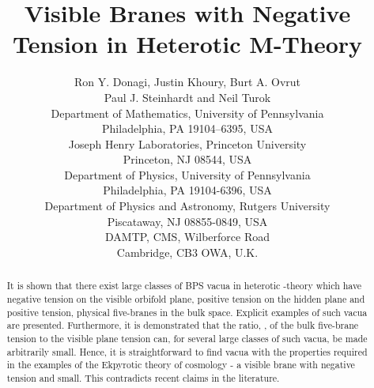 \documentclass[a4paper,12pt]{article}
\numberwithin{equation}{section}
\providecommand{\ns}{\normalsize}
\theoremstyle{plain}
\begin{document}

\begin{titlepage}

\vspace{-10cm}

\title{
   {\LARGE Visible Branes with Negative Tension in Heterotic M-Theory} \\[1em] } 
\author{
   Ron Y. Donagi\coordHE{}, Justin Khoury\coordHE{}, Burt A. Ovrut\coordHE{}\\
   Paul J. Steinhardt\coordHE{} and Neil Turok\coordHE{}\\[0.5cm]
   {\ns {}\coordHE{}Department of Mathematics, University of Pennsylvania} \\[-0.4em]
   {\ns Philadelphia, PA 19104--6395, USA}\\
   {\ns {}\coordHE{}Joseph Henry Laboratories, Princeton University} 
   \\[-0.4em]
   {\ns Princeton, NJ 08544, USA}\\ 
   {\ns {}\coordHE{}Department of Physics, University of Pennsylvania} 
   \\[-0.4em]
   {\ns Philadelphia, PA 19104-6396, USA}\\ 
   {\ns {}\coordHE{}Department of Physics and Astronomy, Rutgers University} 
   \\[-0.4em]
   {\ns Piscataway, NJ 08855-0849, USA}\\ 
   {\ns {}\coordHE{}DAMTP, CMS, Wilberforce Road} \\[-0.4em]
   {\ns Cambridge, CB3 OWA, U.K.}\\}
\date{}

\maketitle

\begin{abstract}

It is shown that there exist large classes of BPS vacua in heterotic \coordHE{}-theory
which have negative tension on the visible orbifold plane, positive tension on the
hidden plane and positive tension, physical five-branes in the bulk space.
Explicit examples of such vacua are presented. Furthermore, it is
demonstrated that the ratio, \myHighlight{$\beta/|\alpha|$}\coordHE{}, of the bulk five-brane tension 
to the visible plane tension can, for several large classes of such vacua, be made
arbitrarily small. Hence, it is straightforward to find vacua 
with the properties required in the examples of the Ekpyrotic theory of 
cosmology - a visible brane with negative tension and \myHighlight{$\beta/|\alpha|$}\coordHE{} small. 
This contradicts recent claims in the literature.

 \end{abstract}

\thispagestyle{empty}

\end{titlepage}
\end{document}
